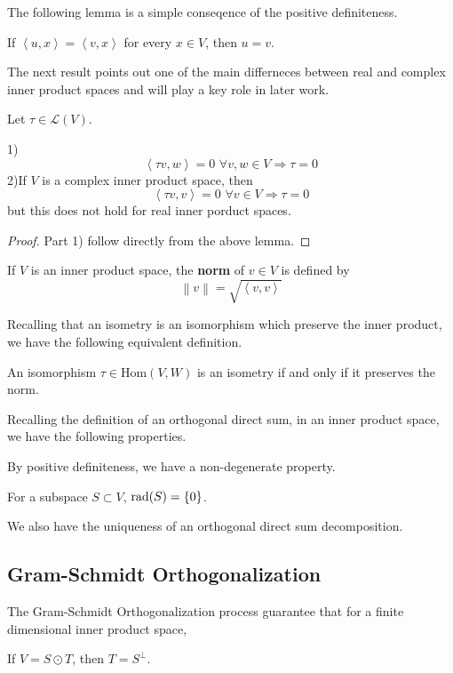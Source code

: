The following lemma is a simple conseqence of the positive definiteness.
\begin{lemma}
If $\left \langle u,x \right \rangle =\left \langle v,x \right \rangle$ for every $x\in V$, then $u=v$.
\end{lemma}
The next result points out one of the main differneces between real and complex inner product spaces and will play a key role in later work. 
\begin{theorem}
Let $\tau\in \mathcal{L}(V)$.\par
1)\begin{equation*}  \left\langle \tau v,w\right\rangle=0\,\, \forall v,w\in V\Longrightarrow \tau=0 \end{equation*}
2)If $V$ is a complex inner product space, then
\begin{equation*} \left\langle\tau v,v\right\rangle=0\,\, \forall v\in V\Longrightarrow\tau=0\end{equation*}
but this does not hold for real inner porduct spaces.
\end{theorem}
\begin{proof}
Part 1) follow directly from the above lemma. 
\end{proof}
\begin{definition}[norm]
If $V$ is an inner product space, the \textbf{norm} of $v\in V$ is defined by
\begin{equation*} \left \| v \right \| =\sqrt{\left \langle v,v \right \rangle } \end{equation*}
\end{definition}
Recalling that an isometry is an isomorphism which preserve the inner product, we have the following equivalent definition.
\begin{theorem}
An isomorphism $\tau\in \text{Hom}(V,W)$ is an isometry if and only if it preserves the norm.
\end{theorem}

Recalling the definition of an orthogonal direct sum, in an inner product space, we have the following properties.\par
By positive definiteness, we have a non-degenerate property.
\begin{theorem}
For a subspace $S\subset V$, $\operatorname{rad}(S)=\left \{ 0 \right \} $.
\end{theorem}

We also have the uniqueness of an orthogonal direct sum decomposition.

\subsection{Gram-Schmidt Orthogonalization}
The Gram-Schmidt Orthogonalization process guarantee that for a finite dimensional inner product space, 
\begin{theorem}
If $V=S\odot T$, then $T=S^\perp$.
\end{theorem}


